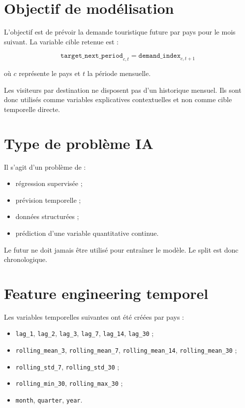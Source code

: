 \documentclass[11pt,a4paper]{report}
\begin{document}
\section{Objectif de modélisation}

L'objectif est de prévoir la demande touristique future par pays pour le mois suivant. La variable cible retenue est :

\[
\texttt{target\_next\_period}_{c,t} = \texttt{demand\_index}_{c,t+1}
\]

où $c$ représente le pays et $t$ la période mensuelle.

Les visiteurs par destination ne disposent pas d'un historique mensuel. Ils sont donc utilisés comme variables explicatives contextuelles et non comme cible temporelle directe.

\section{Type de problème IA}

Il s'agit d'un problème de :

\begin{itemize}[leftmargin=*]
    \item régression supervisée ;
    \item prévision temporelle ;
    \item données structurées ;
    \item prédiction d'une variable quantitative continue.
\end{itemize}

Le futur ne doit jamais être utilisé pour entraîner le modèle. Le split est donc chronologique.

\section{Feature engineering temporel}

Les variables temporelles suivantes ont été créées par pays :

\begin{itemize}[leftmargin=*]
    \item \texttt{lag\_1}, \texttt{lag\_2}, \texttt{lag\_3}, \texttt{lag\_7}, \texttt{lag\_14}, \texttt{lag\_30} ;
    \item \texttt{rolling\_mean\_3}, \texttt{rolling\_mean\_7}, \texttt{rolling\_mean\_14}, \texttt{rolling\_mean\_30} ;
    \item \texttt{rolling\_std\_7}, \texttt{rolling\_std\_30} ;
    \item \texttt{rolling\_min\_30}, \texttt{rolling\_max\_30} ;
    \item \texttt{month}, \texttt{quarter}, \texttt{year}.
\end{itemize}
\end{document}
